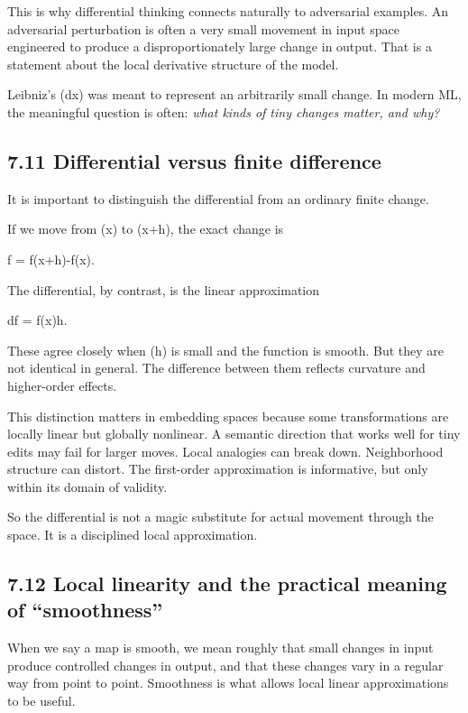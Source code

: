 \documentclass[
]{article}
\begin{document}
This is why differential thinking connects naturally to adversarial
examples. An adversarial perturbation is often a very small movement in
input space engineered to produce a disproportionately large change in
output. That is a statement about the local derivative structure of the
model.

Leibniz's (dx) was meant to represent an arbitrarily small change. In
modern ML, the meaningful question is often: \emph{what kinds of tiny
changes matter, and why?}

\hypertarget{differential-versus-finite-difference}{%
\subsection{7.11 Differential versus finite
difference}\label{differential-versus-finite-difference}}

It is important to distinguish the differential from an ordinary finite
change.

If we move from (x) to (x+h), the exact change is

\Delta f = f(x+h)-f(x).

The differential, by contrast, is the linear approximation

df = \nabla f(x)\cdot h.

These agree closely when (h) is small and the function is smooth. But
they are not identical in general. The difference between them reflects
curvature and higher-order effects.

This distinction matters in embedding spaces because some
transformations are locally linear but globally nonlinear. A semantic
direction that works well for tiny edits may fail for larger moves.
Local analogies can break down. Neighborhood structure can distort. The
first-order approximation is informative, but only within its domain of
validity.

So the differential is not a magic substitute for actual movement
through the space. It is a disciplined local approximation.

\hypertarget{local-linearity-and-the-practical-meaning-of-smoothness}{%
\subsection{7.12 Local linearity and the practical meaning of
``smoothness''}\label{local-linearity-and-the-practical-meaning-of-smoothness}}

When we say a map is smooth, we mean roughly that small changes in input
produce controlled changes in output, and that these changes vary in a
regular way from point to point. Smoothness is what allows local linear
approximations to be useful.
\end{document}

